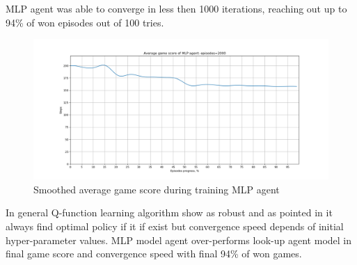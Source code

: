 \documentclass[12pt]{article}
\begin{document}
{\begin{itemize}
MLP agent was able to converge in less then 1000 iterations, reaching out up to 94\% of won episodes out of 100 tries.
\begin{figure}[h!]
\begin{center}
\includegraphics[scale=0.4]{images/mlp_result.png}
\caption{Smoothed average game score during training MLP agent}
\end{center}
\end{figure}
\end{itemize}
In general Q-function learning algorithm show as robust and as pointed in \citep{q_conver} it always find optimal policy if it if exist but convergence speed depends of initial hyper-parameter values. MLP model agent over-performs look-up agent model in final game score and convergence speed with final 94\% of won games.
}

\newpage


\end{document}
